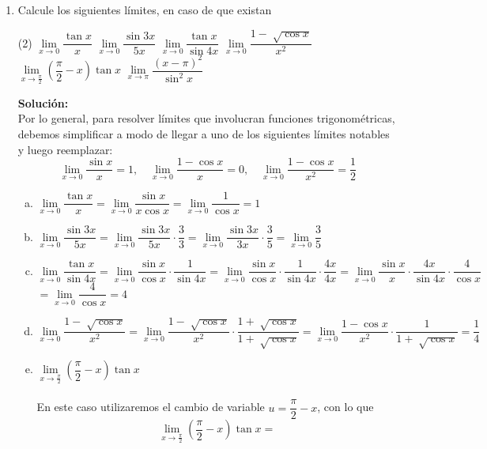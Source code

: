 \documentclass[12pt]{article}
\newenvironment{solucion}
{\begin{mdframed}[backgroundcolor=black!10]
		{\bf Solución:}\\
	}
	{
	\end{mdframed}
}
\newenvironment{preguntas}
{\begin{enumerate}\itemsep12pt
	}
	{
	\end{enumerate}
}
\newcommand{\ra}{\rightarrow}
\begin{document}
\begin{preguntas}
\item Calcule los siguientes límites, en caso de que existan
\begin{tasks}(2)
\task $\lim\limits_{x \ra 0} \dfrac{\tan x}{x}$ 
\task $\lim\limits_{x \ra 0} \dfrac{\sin 3x}{5x}$ 
\task $\lim\limits_{x \ra 0} \dfrac{\tan x}{\sin 4x}$ 
\task $\lim\limits_{x \ra 0} \dfrac{1 - \sqrt[]{\cos x}}{x^2}$ 
\task $\lim\limits_{x \ra \frac{\pi}{2}} \left(\dfrac{\pi}{2} - x \right) \tan x$ 
\task $\lim\limits_{x \ra \pi} \dfrac{(x - \pi)^2}{\sin ^2 x}$ 
\end{tasks}
\begin{solucion}
Por lo general, para resolver límites que involucran funciones trigonométricas, debemos simplificar a modo de llegar a uno de los siguientes límites notables y luego reemplazar:
	$$\lim\limits_{x \ra 0} \dfrac{\sin x}{x} = 1, \quad
	\lim\limits_{x \ra 0} \dfrac{1-\cos x}{x} = 0, \quad
	\lim\limits_{x \ra 0} \dfrac{1 - \cos x}{x^2} = \dfrac{1}{2}$$
\begin{enumerate}[a)]
\item $\lim\limits_{x \ra 0} \dfrac{\tan x}{x} = 
\lim\limits_{x \ra 0} \dfrac{\sin x}{x \cos x} = 
\lim\limits_{x \ra 0} \dfrac{1}{\cos x} = 1$ 
\item $\lim\limits_{x \ra 0} \dfrac{\sin 3x}{5x} = 
\lim\limits_{x \ra 0} \dfrac{\sin 3x}{5x} \cdot \dfrac{3}{3} =
\lim\limits_{x \ra 0} \dfrac{\sin 3x}{3x} \cdot \dfrac{3}{5} = 
\lim\limits_{x \ra 0} \dfrac{3}{5}$ 
\item $\lim\limits_{x \ra 0} \dfrac{\tan x}{\sin 4x} =
\lim\limits_{x \ra 0} \dfrac{\sin x}{\cos x} \cdot \dfrac{1}{\sin 4x} =
\lim\limits_{x \ra 0} \dfrac{\sin x}{\cos x} \cdot \dfrac{1}{\sin 4x} \cdot \dfrac{4x}{4x}  =
\lim\limits_{x \ra 0} \dfrac{\sin x}{x} \cdot \dfrac{4x}{\sin 4x} \cdot \dfrac{4}{\cos x} $ \\
$=\lim\limits_{x \ra 0} \dfrac{4}{\cos x} = 4$
\item $\lim\limits_{x \ra 0} \dfrac{1 - \sqrt[]{\cos x}}{x^2} =
\lim\limits_{x \ra 0} \dfrac{1 - \sqrt[]{\cos x}}{x^2} \cdot \dfrac{1 + \sqrt[]{\cos x}}{1 + \sqrt[]{\cos x}} =
\lim\limits_{x \ra 0} \dfrac{1 - \cos x}{x^2} \cdot \dfrac{1}{1 + \sqrt[]{\cos x}} = \dfrac{1}{4}$ 
\item $\lim\limits_{x \ra \frac{\pi}{2}} \left(\dfrac{\pi}{2} - x \right) \tan x$\\
\\
En este caso utilizaremos el cambio de variable $u = \dfrac{\pi}{2} - x$, con lo que
$$\lim\limits_{x \ra \frac{\pi}{2}} \left(\dfrac{\pi}{2} - x \right) \tan x =
$$
\end{enumerate}
\end{solucion}
\end{preguntas}
\end{document}
